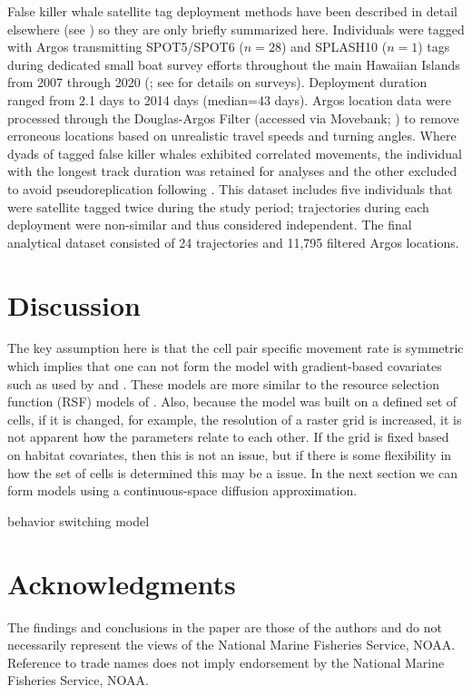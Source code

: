 \documentclass[12pt]{article}
\begin{document}
False killer whale satellite tag deployment methods have been described in detail elsewhere (see \citealt{baird2010movements, baird2012range}) so they are only briefly summarized here. Individuals were tagged with Argos transmitting SPOT5/SPOT6 ($n=28$) and SPLASH10 ($n=1$) tags during dedicated small boat survey efforts throughout the main Hawaiian Islands from 2007 through 2020 (\citealt{baird2012range,baird2021bringing, baird2016lives}; see \citealt{baird2013odontocete} for details on surveys). Deployment duration ranged from 2.1 days to 2014 days (median=43 days). Argos location data were processed through the Douglas-Argos Filter (accessed via Movebank; \citealt{kranstauber2011movebank,douglas2012moderating}) to remove erroneous locations based on unrealistic travel speeds and turning angles. Where dyads of tagged false killer whales exhibited correlated movements, the individual with the longest track duration was retained for analyses and the other excluded to avoid pseudoreplication following \citet{baird2012range}. This dataset includes five individuals that were satellite tagged twice during the study period; trajectories during each deployment were non-similar and thus considered independent. The final analytical dataset consisted of 24 trajectories and 11,795 filtered Argos locations. 

\section{Discussion}


The key assumption here is that the cell pair specific movement rate is symmetric which implies that one can not form the model with gradient-based covariates such as used by \cite{Hanks:2015aa} and \cite{wilsonestimating}. These models are more similar to the resource selection function (RSF) models of \cite{Johnson:2008kx, Johnson:2013fk}. Also, because the model was built on a defined set of cells, if it is changed, for example, the resolution of a raster grid is increased, it is not apparent how the parameters relate to each other. If the grid is fixed based on habitat covariates, then this is not an issue, but if there is some flexibility in how the set of cells is determined this may be a issue. In the next section we can form models using a continuous-space diffusion approximation. 

behavior switching model



\section*{Acknowledgments}
The findings and conclusions in the paper are those of the authors and do not necessarily represent the views of the National Marine Fisheries Service, NOAA. Reference to trade names does not imply endorsement by the National Marine Fisheries Service, NOAA.
\end{document}
